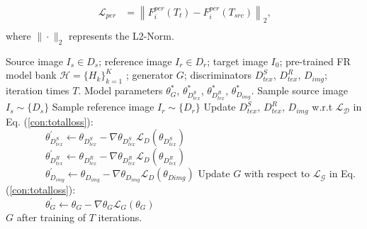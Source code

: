 \documentclass[10pt,journal,compsoc]{IEEEtran}
\begin{document}
\begin{equation}
	\begin{aligned}
\mathcal{L}_{per}&=\left\|F^{per}_i(T_t)-F^{per}_i(T_{src})\right\|_{2}\text{,}\\
	\end{aligned}
\end{equation}
where $\|\cdot\|_{2}$ represents the L2-Norm.

\begin{algorithm}[t]
	\small
	\caption{The training process of the proposed 3DAM-GAN}
	\label{alg:attack}
	\begin{algorithmic}[1]
		\Require Source image $I_s \in D_s$; reference image $I_r \in D_r$; target image $I_0$; pre-trained FR model bank $\mathcal{H}=\{{H_k}\}^{K}_{k=1}$ ; generator $G$; discriminators $D^S_{tex}$, $D^R_{tex}$, $D_{img}$; iteration times $T$.
		\Ensure
		Model parameters $\theta^{*}_G$, $\theta^{*}_{D^S_{tex}}$, $\theta^{*}_{D^R_{tex}}$, $\theta^{*}_{D_{img}}$.
		\State Sample source image $I_s \sim \{D_s\}$
		\State Sample reference image $I_r \sim \{D_r\}$
		\State Update $D^S_{tex}$, $D^R_{tex}$, $D_{img}$ w.r.t $\mathcal{L_D}$ in Eq. (\ref{con:totalloss}): \\
		$\qquad \qquad \theta_{D^S_{tex}}^{\prime} \leftarrow \theta_{D^S_{tex}}-\nabla \theta_{D^S_{tex}} \mathcal{L}_{D}\left(\theta_{D^S_{tex}}\right)$\\
		$\qquad \qquad \theta_{D^R_{tex}}^{\prime} \leftarrow \theta_{D^R_{tex}}-\nabla \theta_{D^R_{tex}} \mathcal{L}_{D}\left(\theta_{D^R_{tex}}\right)$\\
		$\qquad \qquad \theta_{D_{img}}^{\prime} \leftarrow \theta_{D_{img}}-\nabla \theta_{D_{img}} \mathcal{L}_{D}\left(\theta_{D{img}}\right)$
		\State Update $G$ with respect to $\mathcal{L_G}$ in Eq. (\ref{con:totalloss}):\\
		$\qquad \qquad \theta_{G}^{\prime} \leftarrow \theta_{G}-\nabla \theta_{G} \mathcal{L}_{G}\left(\theta_{G}\right)$
		\EndFor \\
		\Return $G$ after training of $T$ iterations.
	\end{algorithmic}
\end{algorithm}
\end{document}

